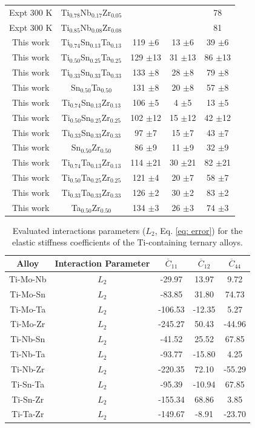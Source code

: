 \begin{longtable}[H]{ c c c c c }
	Expt 300 K \cite{Niinomi2012} & Ti$_{0.78}$Nb$_{0.17}$Zr$_{0.05}$ & & & 78\\
	Expt 300 K \cite{Geetha2009} & Ti$_{0.85}$Nb$_{0.08}$Zr$_{0.08}$ & & & 81\\
	This work & Ti$_{0.74}$Sn$_{0.13}$Ta$_{0.13}$ & 119 $\pm$6 & 13 $\pm$6 & 39 $\pm$6\\
	This work & Ti$_{0.50}$Sn$_{0.25}$Ta$_{0.25}$ & 129 $\pm$13 & 31 $\pm$13 & 86 $\pm$13\\
	This work & Ti$_{0.33}$Sn$_{0.33}$Ta$_{0.33}$ & 133 $\pm$8 & 28 $\pm$8 & 79 $\pm$8\\
	This work & Sn$_{0.50}$Ta$_{0.50}$ & 131 $\pm$8 & 20 $\pm$8 & 57 $\pm$8\\
	This work & Ti$_{0.74}$Sn$_{0.13}$Zr$_{0.13}$ & 106 $\pm$5 & 4 $\pm$5 & 13 $\pm$5\\
	This work & Ti$_{0.50}$Sn$_{0.25}$Zr$_{0.25}$ & 102 $\pm$12 & 15 $\pm$12 & 42 $\pm$12\\
	This work & Ti$_{0.33}$Sn$_{0.33}$Zr$_{0.33}$ & 97 $\pm$7 & 15 $\pm$7 & 43 $\pm$7\\
	This work & Sn$_{0.50}$Zr$_{0.50}$ & 86 $\pm$9 & 11 $\pm$9 & 32 $\pm$9\\
	This work & Ti$_{0.74}$Ta$_{0.13}$Zr$_{0.13}$ & 114 $\pm$21 & 30 $\pm$21 & 82 $\pm$21\\
	This work & Ti$_{0.50}$Ta$_{0.25}$Zr$_{0.25}$ & 121 $\pm$4 & 20 $\pm$7 & 58 $\pm$7\\
	This work & Ti$_{0.33}$Ta$_{0.33}$Zr$_{0.33}$ & 126 $\pm$2 & 30 $\pm$2 & 83 $\pm$2\\
	This work & Ta$_{0.50}$Zr$_{0.50}$ & 134 $\pm$3 & 26 $\pm$3 & 74 $\pm$3\\
\end{longtable}

\newpage
\begin{table}[H]
	\caption{Evaluated interactions parameters ($L_2$, Eq. \ref{eq: error}) for the elastic stiffness coefficients of the Ti-containing ternary alloys.}
	\centering
	\begin{tabular}{ c c c c c }
		\hline
		Alloy & Interaction Parameter & $\overline{C}_{11}$ & $\overline{C}_{12}$ & $\overline{C}_{44}$\\
		\hline
		Ti-Mo-Nb & $L_2$ & -29.97 & 13.97 & 9.72\\
		Ti-Mo-Sn & $L_2$ & -83.85 & 31.80 & 74.73\\
		Ti-Mo-Ta & $L_2$ & -106.53 & -12.35 & 5.27\\
		Ti-Mo-Zr & $L_2$ & -245.27 & 50.43 & -44.96\\
		Ti-Nb-Sn & $L_2$ & -41.52 & 25.52 & 67.85\\
		Ti-Nb-Ta & $L_2$ & -93.77 & -15.80 & 4.25\\
		Ti-Nb-Zr & $L_2$ & -220.35 & 72.10 & -55.29\\
		Ti-Sn-Ta & $L_2$ & -95.39 & -10.94 & 67.85\\
		Ti-Sn-Zr & $L_2$ &  -155.34 & 68.86 & 3.85\\
		Ti-Ta-Zr & $L_2$ & -149.67 & -8.91 & -23.70\\		
		\hline
	\end{tabular}
	\label{Ch6-table:tixyelasip}
\end{table}
\clearpage


